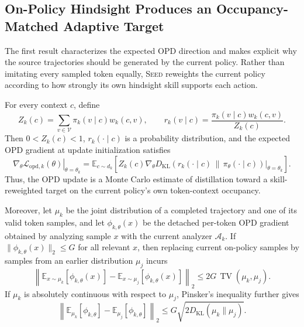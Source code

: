 \subsection{On-Policy Hindsight Produces an Occupancy-Matched Adaptive Target}
\label{app:theory_onpolicy}
The first result characterizes the expected OPD direction and makes explicit why the source trajectories should be generated by the current policy. Rather than imitating every sampled token equally, \textsc{Seed} reweights the current policy according to how strongly its own hindsight skill supports each action.

\begin{proposition}
\label{prop:onpolicy_target}
For every context $c$, define
\begin{equation}
 Z_k(c)
 =
 \sum_{v\in\mathcal V}
 \pi_k(v\mid c)w_k(c,v),
 \qquad
 r_k(v\mid c)
 =
 \frac{\pi_k(v\mid c)w_k(c,v)}{Z_k(c)}.
 \label{eq:onpolicy_target}
\end{equation}
Then $0<Z_k(c)<1$, $r_k(\cdot\mid c)$ is a probability distribution, and the expected OPD gradient at update initialization satisfies
\begin{equation}
 \left.
 \nabla_\theta\mathcal L_{\mathrm{opd},k}(\theta)
 \right|_{\theta=\theta_k}
 =
 \mathbb E_{c\sim d_k}
 \left[
 Z_k(c)
 \left.
 \nabla_\theta
 D_{\mathrm{KL}}
 \left(
 r_k(\cdot\mid c)
 \,\middle\|\,
 \pi_\theta(\cdot\mid c)
 \right)
 \right|_{\theta=\theta_k}
 \right].
 \label{eq:onpolicy_target_gradient}
\end{equation}
Thus, the OPD update is a Monte Carlo estimate of distillation toward a skill-reweighted target on the current policy's own token-context occupancy.

Moreover, let $\mu_k$ be the joint distribution of a completed trajectory and one of its valid token samples, and let $\phi_{k,\theta}(x)$ be the detached per-token OPD gradient obtained by analyzing sample $x$ with the current analyzer $\mathcal A_k$. If
$\|\phi_{k,\theta}(x)\|_2\le G$
for all relevant $x$, then replacing current on-policy samples by samples from an earlier distribution $\mu_j$ incurs
\begin{equation}
 \left\|
 \mathbb E_{x\sim\mu_k}[\phi_{k,\theta}(x)]
 -
 \mathbb E_{x\sim\mu_j}[\phi_{k,\theta}(x)]
 \right\|_2
 \le
 2G\,\operatorname{TV}(\mu_k,\mu_j).
 \label{eq:occupancy_mismatch_tv}
\end{equation}
If $\mu_k$ is absolutely continuous with respect to $\mu_j$, Pinsker's inequality further gives
\begin{equation}
 \left\|
 \mathbb E_{\mu_k}[\phi_{k,\theta}]
 -
 \mathbb E_{\mu_j}[\phi_{k,\theta}]
 \right\|_2
 \le
 G\sqrt{2D_{\mathrm{KL}}(\mu_k\|\mu_j)}.
 \label{eq:occupancy_mismatch_kl}
\end{equation}
\end{proposition}

